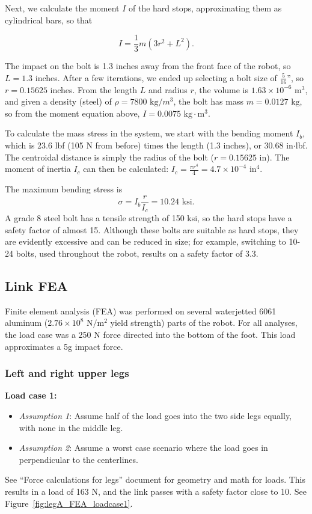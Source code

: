 \documentclass{report}
\begin{document}
Next, we calculate the moment $I$ of the hard stops, approximating them as cylindrical bars, so that

\begin{equation}
I = \frac{1}{3}m(3r^2 + L^2).
\end{equation}

The impact on the bolt is 1.3 inches away from the front face of the robot, so $L = 1.3$ inches. After a few iterations, we ended up selecting a bolt size of $\frac{5}{16}$'', so $r = 0.15625$ inches. From the length $L$ and radius $r$, the volume is $1.63\times 10^{-6} \text{ m}^3$, and given a density (steel) of $\rho = 7800 \text{ kg}/{m}^3$, the bolt has mass $m = 0.0127\text{ kg}$, so from the moment equation above, $I = 0.0075 \text{ kg}\cdot\text{m}^3$.

To calculate the mass stress in the system, we start with the bending moment $I_b$, which is 23.6 lbf (105 N from before) times the length (1.3 inches), or 30.68 in$\cdot$lbf. The centroidal distance is simply the radius of the bolt ($r = 0.15625$ in). The moment of inertia $I_c$ can then be calculated: $I_c = \frac{\pi r^4}{4} = 4.7\times 10^{-4}\text{ in}^4$.

The maximum bending stress is
\begin{equation}
\sigma = I_b\frac{r}{I_c} = 10.24\text{ ksi}.
\end{equation}
A grade 8 steel bolt has a tensile strength of 150 ksi, so the hard stops have a safety factor of almost 15. Although these bolts are suitable as hard stops, they are evidently excessive and can be reduced in size; for example, switching to 10-24 bolts, used throughout the robot, results on a safety factor of 3.3.

\subsection[Link FEA]{Link FEA}
Finite element analysis (FEA) was performed on several waterjetted 6061 aluminum ($2.76\times 10^{8} \text{ N}/\text{m}^2$ yield strength) parts of the robot. For all analyses, the load case was a 250 N force directed into the bottom of the foot. This load approximates a 5g impact force.

\subsubsection[Left and right upper legs]{Left and right upper legs}
\textbf{Load case 1:}
\begin{itemize}
\item \textit{Assumption 1}: Assume half of the load goes into the two side legs equally, with none in the middle leg.
\item \textit{Assumption 2}: Assume a worst case scenario where the load goes in perpendicular to the centerlines.
\end{itemize}
See ``Force calculations for legs'' document for geometry and math for loads. This results in a load of 163 N, and the link passes with a safety factor close to 10. See Figure~\ref{fig:legA_FEA_loadcase1}.
\end{document}

